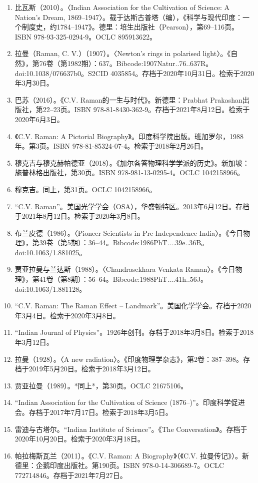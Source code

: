 \begin{enumerate}
\item 比瓦斯（2010）。〈Indian Association for the Cultivation of Science: A Nation's Dream, 1869–1947〉。载于达斯古普塔（编），《科学与现代印度：一个制度史，约1784–1947》。德里：培生出版社（Pearson），第69–116页。ISBN 978-93-325-0294-9。OCLC 895913622。
\item 拉曼（Raman, C. V.）（1907）。〈Newton's rings in polarised light〉。《自然》，第76卷（第1982期）：637。Bibcode:1907Natur..76..637R。doi:10.1038/076637b0。S2CID 4035854。存档于2020年10月31日。检索于2020年3月30日。
\item 巴苏（2016）。《C.V. Raman的一生与时代》。新德里：Prabhat Prakashan出版社，第22–23页。ISBN 978-81-8430-362-9。存档于2021年8月12日。检索于2020年6月3日。
\item 《C.V. Raman: A Pictorial Biography》。印度科学院出版。班加罗尔，1988年。第3页。ISBN 978-81-85324-07-4。检索于2018年2月26日。
\item 穆克吉与穆克赫帕德亚（2018）。《加尔各答物理科学学派的历史》。新加坡：施普林格出版社，第30页。ISBN 978-981-13-0295-4。OCLC 1042158966。
\item 穆克吉。同上，第31页。OCLC 1042158966。
\item “C.V. Raman”。美国光学学会（OSA），华盛顿特区。2013年6月12日。存档于2021年8月12日。检索于2020年3月8日。
\item 布兰皮德（1986）。〈Pioneer Scientists in Pre-Independence India〉。《今日物理》，第39卷（第5期）：36–44。Bibcode:1986PhT....39e..36B。doi:10.1063/1.881025。
\item 贾亚拉曼与兰达斯（1988）。〈Chandrasekhara Venkata Raman〉。《今日物理》，第41卷（第8期）：56–64。Bibcode:1988PhT....41h..56J。doi:10.1063/1.881128。
\item “C.V. Raman: The Raman Effect – Landmark”。美国化学学会。存档于2020年3月4日。检索于2020年3月8日。
\item “Indian Journal of Physics”。1926年创刊。存档于2018年3月8日。检索于2018年3月12日。
\item 拉曼（1928）。〈A new radiation〉。《印度物理学杂志》，第2卷：387–398。存档于2019年5月20日。检索于2018年3月12日。
\item 贾亚拉曼（1989）。*同上*，第30页。OCLC 21675106。
\item “Indian Association for the Cultivation of Science (1876–)”。印度科学促进会。存档于2017年7月17日。检索于2018年3月5日。
\item 雷迪与古塔尔。“Indian Institute of Science”。《The Conversation》。存档于2020年10月20日。检索于2020年3月18日。
\item 帕拉梅斯瓦兰（2011）。《C.V. Raman: A Biography》（《C.V. 拉曼传记》）。新德里：企鹅印度出版社。第190页。ISBN 978-0-14-306689-7。OCLC 772714846。存档于2021年7月27日。

\end{enumerate}
